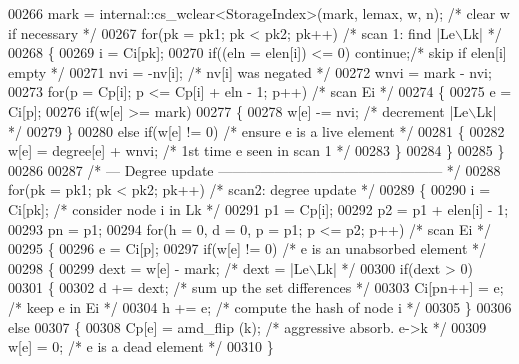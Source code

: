 \begin{DoxyCode}
00266     mark = internal::cs\_wclear<StorageIndex>(mark, lemax, w, n);  \textcolor{comment}{/* clear w if necessary */}
00267     \textcolor{keywordflow}{for}(pk = pk1; pk < pk2; pk++)    \textcolor{comment}{/* scan 1: find |Le\(\backslash\)Lk| */}
00268     \{
00269       i = Ci[pk];
00270       \textcolor{keywordflow}{if}((eln = elen[i]) <= 0) \textcolor{keywordflow}{continue};\textcolor{comment}{/* skip if elen[i] empty */}
00271       nvi = -nv[i];                      \textcolor{comment}{/* nv[i] was negated */}
00272       wnvi = mark - nvi;
00273       \textcolor{keywordflow}{for}(p = Cp[i]; p <= Cp[i] + eln - 1; p++)  \textcolor{comment}{/* scan Ei */}
00274       \{
00275         e = Ci[p];
00276         \textcolor{keywordflow}{if}(w[e] >= mark)
00277         \{
00278           w[e] -= nvi;          \textcolor{comment}{/* decrement |Le\(\backslash\)Lk| */}
00279         \}
00280         \textcolor{keywordflow}{else} \textcolor{keywordflow}{if}(w[e] != 0)        \textcolor{comment}{/* ensure e is a live element */}
00281         \{
00282           w[e] = degree[e] + wnvi; \textcolor{comment}{/* 1st time e seen in scan 1 */}
00283         \}
00284       \}
00285     \}
00286     
00287     \textcolor{comment}{/* --- Degree update ------------------------------------------------ */}
00288     \textcolor{keywordflow}{for}(pk = pk1; pk < pk2; pk++)    \textcolor{comment}{/* scan2: degree update */}
00289     \{
00290       i = Ci[pk];                   \textcolor{comment}{/* consider node i in Lk */}
00291       p1 = Cp[i];
00292       p2 = p1 + elen[i] - 1;
00293       pn = p1;
00294       \textcolor{keywordflow}{for}(h = 0, d = 0, p = p1; p <= p2; p++)    \textcolor{comment}{/* scan Ei */}
00295       \{
00296         e = Ci[p];
00297         \textcolor{keywordflow}{if}(w[e] != 0)             \textcolor{comment}{/* e is an unabsorbed element */}
00298         \{
00299           dext = w[e] - mark;   \textcolor{comment}{/* dext = |Le\(\backslash\)Lk| */}
00300           \textcolor{keywordflow}{if}(dext > 0)
00301           \{
00302             d += dext;         \textcolor{comment}{/* sum up the set differences */}
00303             Ci[pn++] = e;     \textcolor{comment}{/* keep e in Ei */}
00304             h += e;            \textcolor{comment}{/* compute the hash of node i */}
00305           \}
00306           \textcolor{keywordflow}{else}
00307           \{
00308             Cp[e] = amd\_flip (k);  \textcolor{comment}{/* aggressive absorb. e->k */}
00309             w[e] = 0;             \textcolor{comment}{/* e is a dead element */}
00310           \}

\end{DoxyCode}
